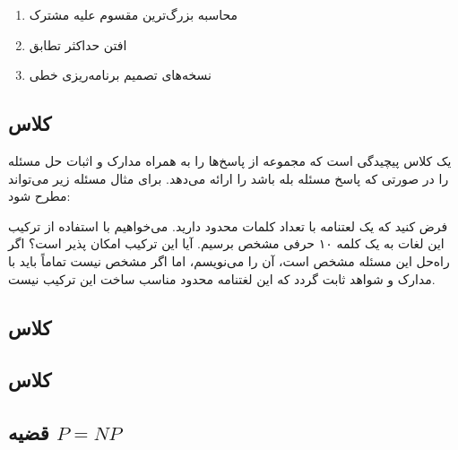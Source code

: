 \documentclass[a4paper]{article}
\begin{document}
\begin{enumerate}
    \item محاسبه بزرگ‌ترین مقسوم علیه مشترک
    \item افتن حداکثر تطابق
    \item نسخه‌های تصمیم برنامه‌ریزی خطی
\end{enumerate}

\subsection{کلاس }

 یک کلاس پیچیدگی است که مجموعه از پاسخ‌ها را به همراه مدارک و اثبات حل
مسئله را در صورتی که پاسخ مسئله بله باشد را ارائه می‌دهد. برای مثال مسئله زیر
می‌تواند مطرح شود:

فرض کنید که یک لعتنامه با تعداد کلمات محدود دارید. می‌خواهیم با استفاده از ترکیب
این لغات به یک کلمه ۱۰ حرفی مشخص برسیم. آیا این ترکیب امکان پذیر است؟ اگر راه‌حل
این مسئله مشخص است، آن را می‌نویسم، اما اگر مشخص نیست تماماً باید با مدارک و
شواهد ثابت گردد که این لغتنامه محدود مناسب ساخت این ترکیب نیست.

\subsection{کلاس }

\subsection{کلاس }

\subsection{قضیه $P = NP$}
\end{document}
